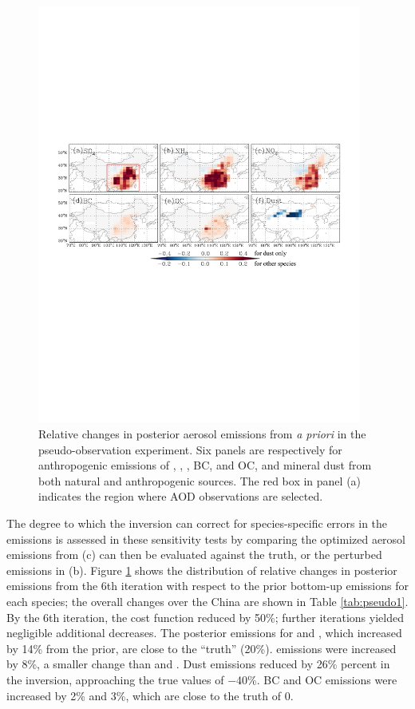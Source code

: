  \begin{figure}[t]  \centering  \includegraphics[width={0.95\textwidth}]{figures/a2.pdf}
  \caption{Relative changes in posterior aerosol emissions from \textit{a priori}
   in the pseudo-observation experiment.
   Six panels are respectively for anthropogenic emissions of , ,
   , BC, and OC, and mineral dust from both natural and anthropogenic sources.
   The red box in panel (a) indicates the region where AOD observations are selected. 
   \citep[Figure adopted from][]{Xu13} }
  \label{fig:pseudo1}
 \end{figure}

 The degree to which the inversion can correct for species-specific errors in the emissions 
 is assessed in these sensitivity tests by comparing the optimized aerosol emissions 
 from (c) can then be evaluated against the truth, or the perturbed emissions in (b).  
 Figure \ref{fig:pseudo1} shows the distribution of relative changes in posterior emissions 
 from the 6th iteration with respect to the prior bottom-up emissions for each species; 
 the overall changes over the China are shown in Table \ref{tab:pseudo1}.
 By the 6th iteration, the cost function reduced by 50\%; 
 further iterations yielded negligible additional decreases. 
 The posterior emissions for  and , which increased by 14\% from the prior, 
 are close to the “truth” (20\%).  emissions were increased by 8\%, 
 a smaller change than  and . 
 Dust emissions reduced by 26\% percent in the inversion, 
 approaching the true values of $-$40\%.
 BC and OC emissions were increased by 2\% and 3\%, which are close to the truth of 0. 

